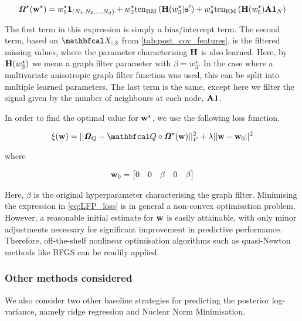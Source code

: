 \begin{equation}
    \bm{\mathit{\Omega}}^\star(\mathbf{w}^\star) = w_1^\star \mathbf{1}_{(N_1, N_2, ..., N_d)} + w_2^\star \text{\textup{ten}}_{\text{\textup{RM}}}\left(\mathbf{H}(w_3^\star) \mathbf{s}'\right) + w_4^\star \text{\textup{ten}}_{\text{\textup{RM}}}\left(\mathbf{H}(w_5^\star) \mathbf{A} \mathbf{1}_N\right) 
\end{equation}

The first term in this expression is simply a bias/intercept term. The second term, based on $\Xt_{:, 3}$ from \cref{tab:post_cov_features}, is the filtered missing values, where the parameter characterising $\mathbf{H}$ is also learned. Here, by $\mathbf{H}(w_3^\star)$ we mean a graph filter parameter with $\beta = w_3^\star$. In the case where a multivariate anisotropic graph filter function was used, this can be split into multiple learned parameters. The last term is the same, except here we filter the signal given by the number of neighbours at each node, $\mathbf{A} \mathbf{1}$. 

In order to find the optimal value for $\mathbf{w}^\star$, we use the following loss function. 

\begin{equation}
    \label{eq:LFP_loss}
    \xi(\w) = || \Omegat_Q - \Qt \circ \Omegat^\star(\w) ||^2_F + \lambda ||\w - \w_0 ||^2
\end{equation}


where 

\begin{equation}
    \mathbf{w}_0 = \begin{bmatrix}
        0 & 0 & \beta & 0 & \beta 
    \end{bmatrix}
\end{equation}

Here, $\beta$ is the original hyperparameter characterising the graph filter. Minimising the expression in \cref{eq:LFP_loss} is in general a non-convex optimisation problem. However, a reasonable initial estimate for $\mathbf{w}$ is easily attainable, with only minor adjustments necessary for significant improvement in predictive performance. Therefore, off-the-shelf nonlinear optimisation algorithms such as quasi-Newton methods like BFGS can be readily applied. 



\subsubsection{Other methods considered}

We also consider two other baseline strategies for predicting the posterior log-variance, namely ridge regression and Nuclear Norm Minimisation. 



